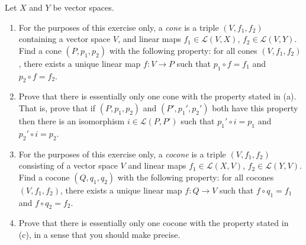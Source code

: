 \documentclass[letterpaper, 12pt]{hmcpset}
\begin{document}
\pagebreak

\begin{problem}[0.14]
	Let $X$ and $Y$ be vector spaces.
	\begin{enumerate}
		\item For the purposes of this exercise only, a \textit{cone} is a triple $(V, f_1, f_2)$ containing a vector space $V$, and linear maps $f_1 \in \mathcal L(V, X)$, $f_2 \in \mathcal L(V, Y)$. Find a cone $(P, p_1, p_2)$ with the following property: for all cones $(V, f_1, f_2)$, there exists a unique linear map $f : V \to P$ such that $p_1 \circ f = f_1$ and $p_2 \circ f = f_2$.
		\item Prove that there is essentially only one cone with the property stated in (a). That is, prove that if $(P, p_1, p_2)$ and $(P', p_1', p_2')$ both have this property then there is an isomorphism $i \in \mathcal L(P, P')$ such that $p_1' \circ i = p_1$ and $p_2' \circ i = p_2$.
		\item For the purposes of this exercise only, a \textit{cocone} is a triple $(V, f_1, f_2)$ consisting of a vector space $V$ and linear maps $f_1 \in \mathcal L(X, V)$, $f_2 \in \mathcal L(Y, V)$. Find a cocone $(Q, q_1, q_2)$ with the following property: for all cocones $(V, f_1, f_2)$, there exists a unique linear map $f : Q \to V$ such that $f \circ q_1 = f_1$ and $f \circ q_2 = f_2$.
		\item Prove that there is essentially only one cocone with the property stated in (c), in a sense that you should make precise.
	\end{enumerate}
\end{problem}
\end{document}
